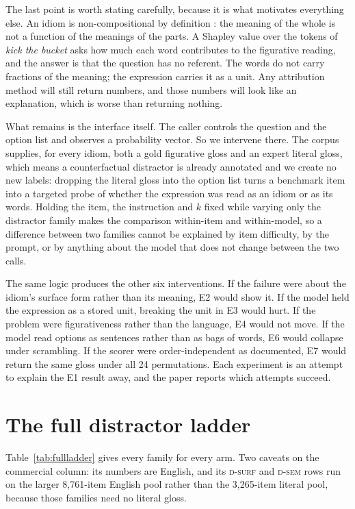 \documentclass[11pt]{article}
\newcommand{\Dsurf}{\textsc{d-surf}}
\newcommand{\Dsem}{\textsc{d-sem}}
\begin{document}
The last point is worth stating carefully, because it is what motivates
everything else. An idiom is non-compositional by definition
\citep{nunberg1994idioms}: the meaning of the whole is not a function of the
meanings of the parts. A Shapley value over the tokens of \emph{kick the bucket}
asks how much each word contributes to the figurative reading, and the answer is
that the question has no referent. The words do not carry fractions of the
meaning; the expression carries it as a unit. Any attribution method will still
return numbers, and those numbers will look like an explanation, which is worse
than returning nothing.

What remains is the interface itself. The caller controls the question and the
option list and observes a probability vector. So we intervene there. The
corpus supplies, for every idiom, both a gold figurative gloss and an expert
literal gloss, which means a counterfactual distractor is already annotated and
we create no new labels: dropping the literal gloss into the option list turns a
benchmark item into a targeted probe of whether the expression was read as an
idiom or as its words. Holding the item, the instruction and $k$ fixed while
varying only the distractor family makes the comparison within-item and
within-model, so a difference between two families cannot be explained by item
difficulty, by the prompt, or by anything about the model that does not change
between the two calls.

The same logic produces the other six interventions. If the failure were about
the idiom's surface form rather than its meaning, E2 would show it. If the model
held the expression as a stored unit, breaking the unit in E3 would hurt. If the
problem were figurativeness rather than the language, E4 would not move. If the
model read options as sentences rather than as bags of words, E6 would collapse
under scrambling. If the scorer were order-independent as documented, E7 would
return the same gloss under all 24 permutations. Each experiment is an attempt
to explain the E1 result away, and the paper reports which attempts succeed.

\section{The full distractor ladder}
\label{app:ladder}

Table~\ref{tab:fullladder} gives every family for every arm. Two caveats on the
commercial column: its numbers are English, and its \Dsurf{} and \Dsem{} rows
run on the larger 8{,}761-item English pool rather than the 3{,}265-item
literal pool, because those families need no literal gloss.
\end{document}
